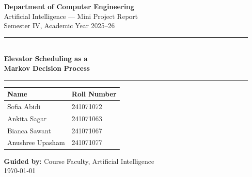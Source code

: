 \documentclass[12pt,a4paper]{article}
\begin{document}
\begin{titlepage}
    \centering
    \vspace*{1.5cm}

    {\Large \textbf{Department of Computer Engineering}}\\[0.3em]
    {\large Artificial Intelligence — Mini Project Report}\\[0.3em]
    {\small Semester IV, Academic Year 2025--26}

    \vspace{1.5cm}
    \rule{\linewidth}{1.5pt}\\[0.4em]
    {\LARGE \textbf{Elevator Scheduling as a\\[0.2em]
    Markov Decision Process}}\\[0.4em]
    \rule{\linewidth}{1.5pt}

    \vspace{1.5cm}

    \begin{tabular}{ll}
        \toprule
        \textbf{Name}       & \textbf{Roll Number} \\
        \midrule
        Sofia Abidi         & 241071072 \\
        Ankita Sagar        & 241071063 \\
        Bianca Sawant       & 241071067 \\
        Anushree Upasham    & 241071077 \\
        \bottomrule
    \end{tabular}

    \vspace{2cm}

    \textbf{Guided by:} Course Faculty, Artificial Intelligence\\[1em]
    \today
\end{titlepage}

\begin{abstract}
Elevator scheduling is a classical operational research problem that maps naturally
onto the Markov Decision Process (MDP) framework from Artificial Intelligence.
In this project we model a single-elevator, $N$-floor building as a discrete-time
MDP with Poisson passenger arrivals and peak/off-peak traffic patterns.
We implement and compare three scheduling policies: a tabular
\textbf{Q-Learning} agent trained from experience, an
\textbf{Ant Colony Optimisation (ACO)} agent that evolves pheromone-guided
floor-visit sequences online, an \textbf{Adaptive Beam Search} agent that performs
bounded lookahead at every decision step, and a \textbf{Random} baseline.
All agents use the identical simulation environment without any modification to the
core logic.  Results show that all three AI agents outperform the random baseline;
Q-Learning achieves competitive performance after sufficient training while ACO and
Beam Search demonstrate strong anytime behaviour.
A Flask + React web interface provides a real-time interactive visualisation of each
agent's internal reasoning.
\end{abstract}
\end{document}
